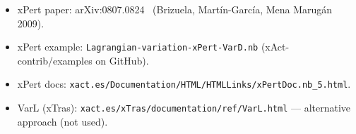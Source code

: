 \begin{itemize}
  \item xPert paper: arXiv:0807.0824~\cite{brizuela2009xpert} (Brizuela, Mart\'in-Garc\'ia, Mena Marug\'an 2009).
  \item xPert example: \texttt{Lagrangian-variation-xPert-VarD.nb} (xAct-contrib/examples on GitHub).
  \item xPert docs: \texttt{xact.es/Documentation/HTML/HTMLLinks/xPertDoc.nb\_5.html}.
  \item VarL (xTras): \texttt{xact.es/xTras/documentation/ref/VarL.html} --- alternative approach (not used).
\end{itemize}
